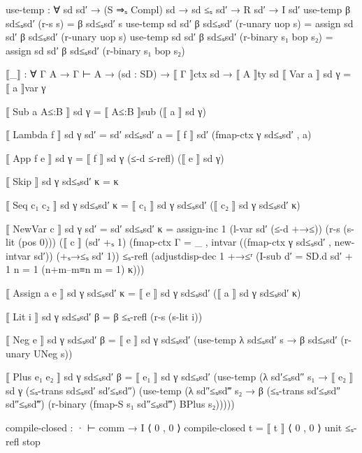 \documentclass{article}
\begin{document}
\begin{prev}
\begin{code}
use-temp : ∀ {sd sd′} → (S ⇒ₛ Compl) sd → sd ≤ₛ sd′ → R sd′ → I sd′
use-temp β sd≤ₛsd′ (r-s s) = β sd≤ₛsd′ s
use-temp {sd} {sd′} β sd≤ₛsd′ (r-unary uop s) = 
    assign sd sd′ β sd≤ₛsd′ (r-unary uop s)
use-temp {sd} {sd′} β sd≤ₛsd′ (r-binary s₁ bop s₂) = 
    assign sd sd′ β sd≤ₛsd′ (r-binary s₁ bop s₂)


⟦_⟧ : ∀ {Γ A} → Γ ⊢ A → (sd : SD) → ⟦ Γ ⟧ctx sd → ⟦ A ⟧ty sd
⟦ Var a ⟧ sd γ = ⟦ a ⟧var γ

⟦ Sub a A≤:B ⟧ sd γ = ⟦ A≤:B ⟧sub (⟦ a ⟧ sd γ)

⟦ Lambda f ⟧ sd γ {sd′ = sd′} sd≤ₛsd′ a = ⟦ f ⟧ sd′ (fmap-ctx γ sd≤ₛsd′ , a)

⟦ App f e ⟧ sd γ = ⟦ f ⟧ sd γ (≤-d ≤-refl) (⟦ e ⟧ sd γ)

⟦ Skip ⟧ sd γ sd≤ₛsd′ κ = κ

⟦ Seq c₁ c₂ ⟧ sd γ sd≤ₛsd′ κ = ⟦ c₁ ⟧ sd γ sd≤ₛsd′ (⟦ c₂ ⟧ sd γ sd≤ₛsd′ κ)

⟦ NewVar c ⟧ sd γ {sd′ = sd′} sd≤ₛsd′ κ = 
    assign-inc 1 
        (l-var sd′ (≤-d +→≤))
        (r-s (s-lit (pos 0)))
        (⟦ c ⟧
            (sd′ +ₛ 1)
            (fmap-ctx {Γ = _ , intvar} 
                ((fmap-ctx γ sd≤ₛsd′ , new-intvar sd′)) 
                (+ₛ→≤ₛ {sd′} {1}))
            ≤ₛ-refl
            (adjustdisp-dec 1 +→≤ʳ
                (I-sub {d′ = SD.d sd′ + 1} {n = 1} 
                    (n+m–m≡n {m = 1}) κ)))

⟦ Assign a e ⟧ sd γ sd≤ₛsd′ κ = ⟦ e ⟧ sd γ sd≤ₛsd′ (⟦ a ⟧ sd γ sd≤ₛsd′ κ)

⟦ Lit i ⟧ sd γ sd≤ₛsd′ β = β ≤ₛ-refl (r-s (s-lit i))

⟦ Neg e ⟧ sd γ sd≤ₛsd′ β = 
    ⟦ e ⟧ sd γ sd≤ₛsd′ (use-temp λ sd≤ₛsd′ s → β sd≤ₛsd′ (r-unary UNeg s))
  
⟦ Plus e₁ e₂ ⟧ sd γ sd≤ₛsd′ β = 
    ⟦ e₁ ⟧ sd γ sd≤ₛsd′ 
        (use-temp (λ sd′≤ₛsd″ s₁ → ⟦ e₂ ⟧ sd γ (≤ₛ-trans sd≤ₛsd′ sd′≤ₛsd″)
            (use-temp (λ sd″≤ₛsd‴ s₂ → β (≤ₛ-trans sd′≤ₛsd″ sd″≤ₛsd‴)
                (r-binary (fmap-S s₁ sd″≤ₛsd‴) BPlus s₂)))))

compile-closed : · ⊢ comm → I ⟨ 0 , 0 ⟩
compile-closed t = ⟦ t ⟧ ⟨ 0 , 0 ⟩ unit ≤ₛ-refl stop
\end{code}
\end{prev}
\end{document}
